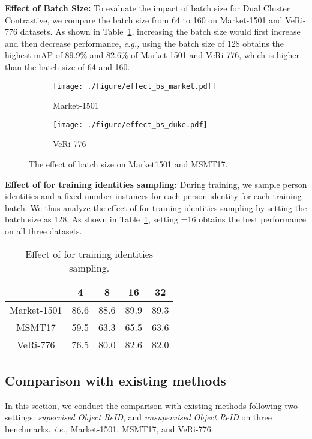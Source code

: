 \documentclass[10pt,twocolumn,letterpaper]{article}
\begin{document}
\textbf{Effect of Batch Size:}
To evaluate the impact of batch size for Dual Cluster Contrastive, we compare the batch size from 64 to 160 on Market-1501 and VeRi-776 datasets.
As shown in Table~\ref{fig:effect_bs}, increasing the batch size would first increase and then decrease performance, \emph{e.g.,} using the batch size of 128 obtains the highest mAP of 89.9\% and 82.6\% of Market-1501 and VeRi-776, which is higher than the batch size of 64 and 160.



\begin{figure}
\centering
\begin{subfigure}{0.49\linewidth}
\texttt{[image: ./figure/effect\_bs\_market.pdf]}
\caption{Market-1501}
\end{subfigure}
\begin{subfigure}{0.49\linewidth}
\texttt{[image: ./figure/effect\_bs\_duke.pdf]}
\caption{VeRi-776}
\end{subfigure}
\caption{The effect of batch size on Market1501 and MSMT17.}
\label{fig:effect_bs}
\end{figure}

\textbf{Effect of  for training identities sampling:}
During training, we sample  person identities and a fixed number  instances for each person identity for each training batch. 
We thus analyze the effect of  for training identities sampling by setting the batch size as 128. 
As shown in Table~\ref{tab:effect_k}, setting =16 obtains the best performance on all three datasets.

 \begin{table}
\footnotesize
\begin{center}
\begin{tabular}{c|cccc}
\toprule
          & 4& 8 & 16 & 32\\
\midrule
Market-1501&86.6&88.6&89.9& 89.3\\
MSMT17 &59.5&63.3&65.5&63.6\\
VeRi-776 &76.5&80.0&82.6&82.0\\
\bottomrule
\end{tabular}
\caption{\small Effect of  for training identities sampling.}
\label{tab:effect_k}
\end{center}
\end{table}

\subsection{Comparison with existing methods}
In this section, we conduct the comparison with existing methods following two settings: \emph{supervised Object ReID}, and \emph{unsupervised Object ReID} on three benchmarks, \emph{i.e.,} Market-1501, MSMT17, and VeRi-776.
\end{document}
